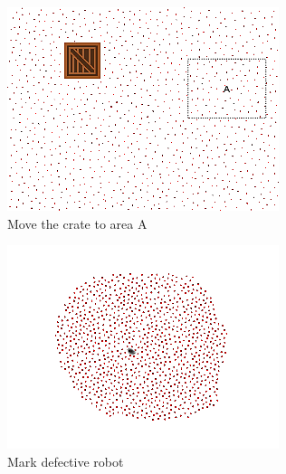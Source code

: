 \documentclass[]{article}
\begin{document}
\begin{figure}
\begin{subfigure}{0.42\textwidth}
		\includegraphics[width=\linewidth]{slide_images/Swarm_Robot_Control_-_1000_Robot_0027.png}
		\caption{Move the crate to area A}
		\label{fig:sub2}
	\end{subfigure}%
	\begin{subfigure}{0.42\textwidth}
		\centering
		\includegraphics[width=\linewidth]{slide_images/Swarm_Robot_Control_-_1000_Robot_0029.png}
		\caption{Mark defective robot}
		\label{fig:sub1}
	\end{subfigure}
	\begin{subfigure}{0.42\textwidth}
		\centering

\end{subfigure}
\end{figure}
\end{document}
